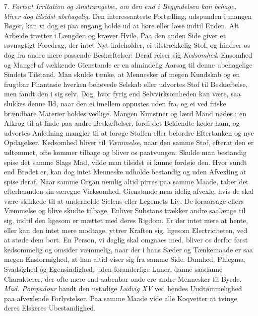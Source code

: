 \documentclass[12pt,a4paper]{article}
\newcommand{\opage}[1]{\marginnote{\footnotesize\textit{[#1]}}}
\begin{document}
7. \emph{Fortsat Irritation og Anstrængelse, om den end i Begyndelsen kan behage, bliver
dog tilsidst ubehagelig.} Den interessanteste Fortælling, udspunden i mangen Bøger, kan vi
dog ei paa engang holde ud at høre eller læse indtil Enden. Alt Arbeide trætter i Længden
og kræver Hvile. Paa den anden Side giver et søvnagtigt Foredrag, der intet Nyt
indeholder, ei tilstrækkelig Stof, og hindrer os dog fra andre mere passende
Beskæftelser: Deraf
\opage{202} reiser sig \emph{Kedsomhed}. Ensomhed og Mangel af vækkende Gienstande er en almindelig
Aarsag til denne ubehagelige Sindets Tilstand. Man skulde tænke, at Mennesker af megen
Kundskab og en frugtbar Phantasie hverken behøvede Selskab eller udvortes Stof til
Beskæftelse, men fandt den i sig selv. Dog, hvor fyrig end Selvvirksomheden kan være, saa
slukkes denne Ild, naar den ei imellem oppustes uden fra, og ei ved friske brændbare
Materier holdes vedlige. Mangen Kunstner og lærd Mand nødes i en Afkrog til at finde paa
andre Beskæftelser, fordi det Bekiendte keder ham, og udvortes Anledning mangler til at
forøge Stoffen eller befordre Eftertanken og nye Opdagelser. Kedsomhed bliver til
\emph{Væmmelse}, naar den samme Stof, efterat den er udtømmet, ofte kommer tilbage og
bliver os paatvungen. Skulde man bestandig spise det samme Slags Mad, vilde man tilsidst
ei kunne fordøie den. Hvor sundt end Brødet er, kan dog intet Menneske udholde bestandig
og uden Afvexling at spise deraf. Naar samme Organ nemlig altid pirres paa samme Maade,
taber det efterhaanden sin særegne Virksomhed. Gienstande maa idelig afvexle, hvis de skal
være skikkede til at underholde Sielens eller Legemets Liv. De foraarsage ellers Væmmelse
og blive skudte tilbage. Enhver Substans trækker andre saalænge til sig, indtil den ligesom
er mættet med deres Rigdom. Er der intet mere at hente, eller kan den intet mere modtage,
yttrer Kraften sig,
\opage{203} ligesom Electriciteten, ved at støde dem bort. En Person, vi daglig skal omgaaes med,
bliver os derfor først kedsommelig og omsider væmmelig, naar der i hans Sæder og
Tænkemaade er saa megen Ensformighed, at han altid viser sig fra samme Side. Dumhed,
Phlegma, Svadsighed og Egensindighed, uden foranderlige Luner, danne saadanne Charakterer,
der ofte mere end aabenbar onde ere andre Mennesker til Byrde. \emph{Mad. Pompadour} bandt
den ustadige \emph{Ludvig XV} ved hendes Uudtømmelighed paa afvexlende Forlystelser. Paa
samme Maade vide alle Koqvetter at tvinge deres Elskeres Ubestandighed.
\end{document}
